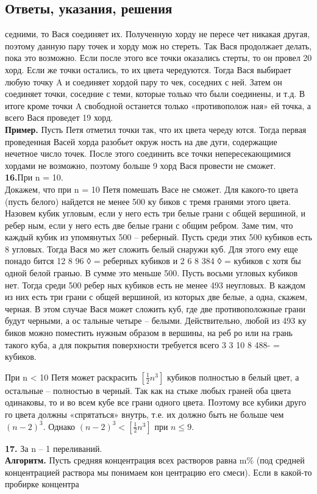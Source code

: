 \pagestyle{empty}
\begin{center}
    \section*{Ответы, указания, решения}
\end{center}
\begin{multicols}{2}
\raggedright
 седними, то Вася соединяет их. Полученную хорду не пересе
чет никакая другая, поэтому данную пару точек и хорду мож
но стереть. Так Вася продолжает делать, пока это возможно.
 Если после этого все точки оказались стерты, то он провел 20
 хорд. Если же точки остались, то их цвета чередуются. Тогда
 Вася выбирает любую точку A и соединяет хордой пару то
чек, соседних с ней. Затем он соединяет точки, соседние с
 теми, которые только что были соединены, и т.д. В итоге
 кроме точки A свободной останется только «противополож
ная» ей точка, а всего Вася проведет 19 хорд.\\
 \textbf{Пример.} Пусть Петя отметил точки так, что их цвета череду
ются. Тогда первая проведенная Васей хорда разобьет окруж
ность на две дуги, содержащие нечетное число точек. После
 этого соединить все точки непересекающимися хордами не
возможно, поэтому больше 9 хорд Вася провести не сможет.\\
\textbf{16.}При n = 10.\\
 Докажем, что при n = 10 Петя помешать Васе не сможет.
 Для какого-то цвета (пусть белого) найдется не менее 500 ку
биков с тремя гранями этого цвета. Назовем кубик угловым,
 если у него есть три белые грани с общей вершиной, и ребер
ным, если у него есть две белые грани с общим ребром. Заме
тим, что каждый кубик из упомянутых 500 – реберный.
 Пусть среди этих 500 кубиков есть 8 угловых. Тогда Вася мо
жет сложить белый снаружи куб. Для этого ему еще понадо
бится 12 8 96 ◊ = реберных кубиков и 2 6 8 384 ◊ = кубиков с
 хотя бы одной белой гранью. В сумме это меньше 500.
 Пусть восьми угловых кубиков нет. Тогда среди 500 ребер
ных кубиков есть не менее 493 неугловых. В каждом из них
 есть три грани с общей вершиной, из которых две белые, а
 одна, скажем, черная. В этом случае Вася может сложить
 куб, где две противоположные грани будут черными, а ос
тальные четыре – белыми. Действительно, любой из 493 ку
биков можно поместить нужным образом в вершины, на реб
ро или на грань такого куба, а для покрытия поверхности
 требуется всего 3 3 10 8 488- = кубиков.\par
  При n < 10 Петя может раскрасить $ \left[  \frac{ 1 } {2} n^3 \right]$
  кубиков полностью в белый цвет, а остальные – полностью в черный. Так
 как на стыке любых граней оба цвета одинаковы, то и во
 всем кубе все грани одного цвета. Поэтому все кубики друго
го цвета должны «спрятаться» внутрь, т.е. их должно быть
 не больше чем $(n-2)^3$. Однако $(n-2)^3<\left[  \frac{ 1 } {2} n^3 \right]$
 при $n\le9$.\par
\textbf{17.}  За n – 1 переливаний.\\
\textbf{Алгоритм.} Пусть средняя концентрация всех растворов равна
 m\% (под средней концентрацией раствора мы понимаем кон
центрацию его смеси). Если в какой-то пробирке концентра


\end{multicols}
